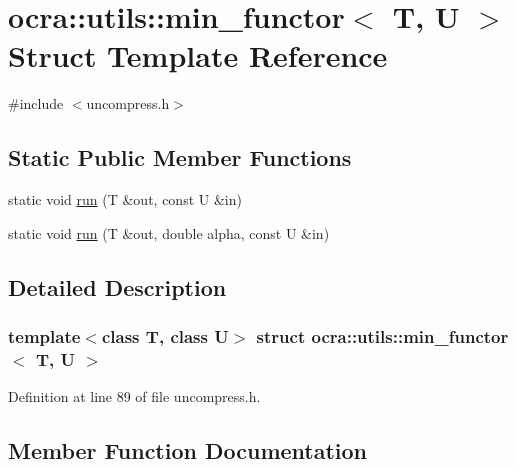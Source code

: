 \hypertarget{structocra_1_1utils_1_1min__functor}{}\section{ocra\+:\+:utils\+:\+:min\+\_\+functor$<$ T, U $>$ Struct Template Reference}
\label{structocra_1_1utils_1_1min__functor}


{\ttfamily \#include $<$uncompress.\+h$>$}

\subsection*{Static Public Member Functions}
\begin{DoxyCompactItemize}
\item 
static void \hyperlink{structocra_1_1utils_1_1min__functor_ac492618d2b833646925687c8b799be6a}{run} (T \&out, const U \&in)
\item 
static void \hyperlink{structocra_1_1utils_1_1min__functor_ab4644d20e3335904183c8f9f5b7eb097}{run} (T \&out, double alpha, const U \&in)
\end{DoxyCompactItemize}


\subsection{Detailed Description}
\subsubsection*{template$<$class T, class U$>$\newline
struct ocra\+::utils\+::min\+\_\+functor$<$ T, U $>$}



Definition at line 89 of file uncompress.\+h.



\subsection{Member Function Documentation}
\hypertarget{structocra_1_1utils_1_1min__functor_ac492618d2b833646925687c8b799be6a}{}\label{structocra_1_1utils_1_1min__functor_ac492618d2b833646925687c8b799be6a} 
